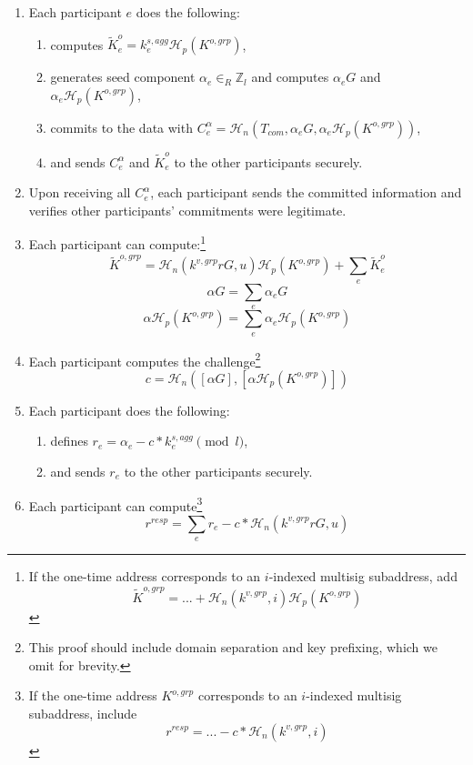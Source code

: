 \begin{enumerate}
    \item Each participant $e$ does the following:
    \begin{enumerate}
        \item computes $\tilde{K}^{o}_{e} = k^{s,agg}_e \mathcal{H}_p(K^{o,grp})$,
        \item generates seed component $\alpha_e \in_R \mathbb{Z}_l$ and computes $\alpha_e G$ and $\alpha_e \mathcal{H}_p(K^{o,grp})$,
        \item commits to the data with $C^{\alpha}_{e} = \mathcal{H}_n(T_{com}, \alpha_e G, \alpha_e \mathcal{H}_p(K^{o,grp}))$,
        \item and sends $C^{\alpha}_{e}$ and $\tilde{K}^{o}_{e}$ to the other participants securely.
    \end{enumerate}
    \item Upon receiving all $C^{\alpha}_{e}$, each participant sends the committed information and verifies other participants' commitments were legitimate.
    \item Each participant can compute:\footnote{If the one-time address corresponds to an $i$-indexed multisig subaddress, add
    \[\tilde{K}^{o,grp} = ... + \mathcal{H}_n(k^{v,grp},i) \mathcal{H}_p(K^{o,grp})\]}\vspace{.175cm}
    \[\tilde{K}^{o,grp} = \mathcal{H}_n(k^{v,grp} r G, u) \mathcal{H}_p(K^{o,grp}) + \sum_e \tilde{K}^{o}_{e}\]
    \[\alpha G = \sum_e \alpha_{e} G\]
    \[\alpha \mathcal{H}_p(K^{o,grp}) = \sum_e \alpha_{e} \mathcal{H}_p(K^{o,grp})\]
    \item Each participant computes the challenge\footnote{This proof should include domain separation and key prefixing, which we omit for brevity.}\vspace{.175cm}
    \[c = \mathcal{H}_n([\alpha G],[\alpha \mathcal{H}_p(K^{o,grp})])\]
    \item Each participant does the following:
    \begin{enumerate}
        \item defines $r_e = \alpha_e - c*k^{s,agg}_e \pmod l$,
        \item and sends $r_e$ to the other participants securely.
    \end{enumerate}
    \item Each participant can compute\footnote{If the one-time address $K^{o,grp}$ corresponds to an $i$-indexed multisig subaddress, include
    \[r^{resp} = ... - c*\mathcal{H}_n(k^{v,grp},i)\]}\vspace{.175cm}
    \[r^{resp} = \sum_e r_e - c*\mathcal{H}_n(k^{v,grp} r G, u)\]
\end{enumerate}

